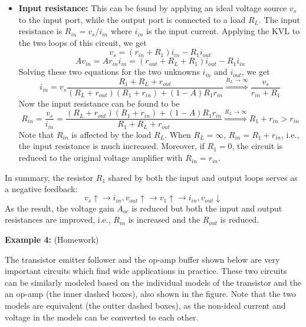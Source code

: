 \documentclass{article}
\begin{document}
\begin{itemize}
\item {\bf Input resistance:} This can be found by applying an ideal voltage
  source $v_s$ to the input port, while the output port is connected to a 
  load $R_L$. The input resistance is $R_{in}=v_s/i_{in}$ where $i_{in}$ is
  the input current. Applying the KVL to the two loops of this circuit, we
  get
  \begin{equation} 
    v_s=(r_{in}+R_1) i_{in}-R_1 i_{out} 
  \end{equation}
  \begin{equation}
    A v_{in}=Ar_{in}i_{in}=(r_{out}+R_L+R_1)i_{out}-R_1i_{in} 
  \end{equation}
  Solving these two equations for the two unknowns $i_{in}$ and $i_{out}$,
  we get
  \begin{equation}
    i_{in}=v_s \frac{R_1+R_L+r_{out}}{(R_L+r_{out})(R_1+r_{in})+(1-A)R_1r_{in}}
    \stackrel{R_L\rightarrow \infty}{\Longrightarrow} \frac{v_s}{r_{in}+R_1} 
  \end{equation}
  Now the input resistance can be found to be
  \begin{equation} 
    R_{in}=\frac{v_s}{i_{in}}=\frac{(R_L+r_{out})(R_1+r_{in})+(1-A)R_1r_{in}}{R_1+R_L+r_{out}}
    \stackrel{R_L\rightarrow \infty}{\Longrightarrow} R_1+r_{in}>r_{in} 
  \end{equation}  
  Note that $R_{in}$ is affected by the load $R_L$. When $R_L=\infty$,
  $R_{in}=R_1+r_{in}$, i.e., the input resistance is much increased. 
  Moreover, if $R_1=0$, the circuit is reduced to the original voltage 
  amplifier with $R_{in}=r_{in}$.
\end{itemize}
In summary, the resistor $R_1$ shared by both the input and output loops
serves as a negative feedback:
\begin{equation}
  v_s\uparrow \rightarrow i_{in}, v_{out}\uparrow \rightarrow v_1\uparrow 
  \rightarrow i_{in}, v_{out}\downarrow 
\end{equation}
As the result, the voltage gain $A_{oc}$ is reduced but both the input and
output resistances are improved, i.e., $R_{in}$ is increased and the $R_{out}$
is reduced.

{\bf Example 4:} (Homework)

The transistor emitter follower and the op-amp buffer shown below 
are very important circuits which find wide applications in 
practice. These two circuits can be similarly modeled based on the 
individual models of the transistor and the an op-amp (the inner
dashed boxes), also shown in the figure. Note that the two models 
are equivalent (the outter dashed boxes), as the non-ideal current 
and voltage in the models can be converted to each other.
\end{document}
